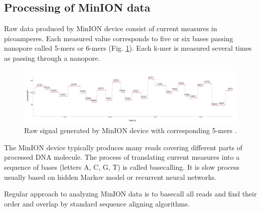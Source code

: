 \subsection{Processing of MinION data}
Raw data produced by MinION device consist of current measures in picoamperes.
Each measured value corresponds to five or six bases passing nanopore called 5-mers or 6-mers (Fig. \ref{fig:kmers}).
Each k-mer is measured several times as passing through a nanopore.

\begin{figure}
  \centering
  \includegraphics[width=1.0\textwidth]{images/kmers}
  \caption{Raw signal generated by MinION device with corresponding 5-mers \cite{kmersimage}.}
  \label{fig:kmers}
\end{figure}

The MinION device typically produces many reads covering different parts of processed DNA molecule.
The process of translating current measures into a sequence of bases (letters A, C, G, T) is called basecalling. 
It is slow process usually based on hidden Markov model or recurrent neural networks. 

Regular approach to analyzing MinION data is to basecall all reads and find their order and overlap by standard 
sequence aligning algorithms.